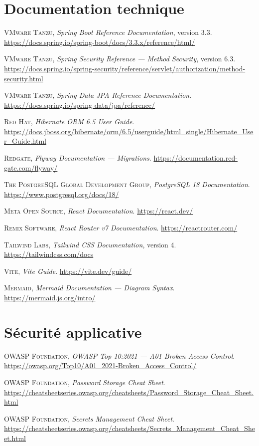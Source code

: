 \section*{Documentation technique}

\begin{enumerate}[label={[\arabic*]},leftmargin=*,start=9]
  \item \textsc{VMware Tanzu}, \emph{Spring Boot Reference Documentation}, version 3.3.
        \url{https://docs.spring.io/spring-boot/docs/3.3.x/reference/html/}
  \item \textsc{VMware Tanzu}, \emph{Spring Security Reference --- Method Security},
        version 6.3.
        \url{https://docs.spring.io/spring-security/reference/servlet/authorization/method-security.html}
  \item \textsc{VMware Tanzu}, \emph{Spring Data JPA Reference Documentation}.
        \url{https://docs.spring.io/spring-data/jpa/reference/}
  \item \textsc{Red Hat}, \emph{Hibernate ORM 6.5 User Guide}.
        \url{https://docs.jboss.org/hibernate/orm/6.5/userguide/html_single/Hibernate_User_Guide.html}
  \item \textsc{Redgate}, \emph{Flyway Documentation --- Migrations}.
        \url{https://documentation.red-gate.com/flyway/}
  \item \textsc{The PostgreSQL Global Development Group}, \emph{PostgreSQL 18
        Documentation}. \url{https://www.postgresql.org/docs/18/}
  \item \textsc{Meta Open Source}, \emph{React Documentation}.
        \url{https://react.dev/}
  \item \textsc{Remix Software}, \emph{React Router v7 Documentation}.
        \url{https://reactrouter.com/}
  \item \textsc{Tailwind Labs}, \emph{Tailwind CSS Documentation}, version 4.
        \url{https://tailwindcss.com/docs}
  \item \textsc{Vite}, \emph{Vite Guide}. \url{https://vite.dev/guide/}
  \item \textsc{Mermaid}, \emph{Mermaid Documentation --- Diagram Syntax}.
        \url{https://mermaid.js.org/intro/}
\end{enumerate}

\section*{Sécurité applicative}

\begin{enumerate}[label={[\arabic*]},leftmargin=*,start=20]
  \item \textsc{OWASP Foundation}, \emph{OWASP Top 10:2021 --- A01 Broken Access Control}.
        \url{https://owasp.org/Top10/A01_2021-Broken_Access_Control/}
  \item \textsc{OWASP Foundation}, \emph{Password Storage Cheat Sheet}.
        \url{https://cheatsheetseries.owasp.org/cheatsheets/Password_Storage_Cheat_Sheet.html}
  \item \textsc{OWASP Foundation}, \emph{Secrets Management Cheat Sheet}.
        \url{https://cheatsheetseries.owasp.org/cheatsheets/Secrets_Management_Cheat_Sheet.html}
\end{enumerate}
